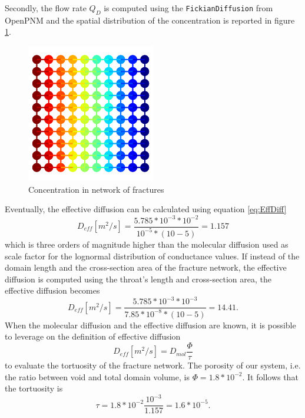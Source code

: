 \documentclass{article}
\begin{document}
Secondly, the flow rate $Q_D$ is computed using the \texttt{FickianDiffusion} from OpenPNM and the spatial distribution of the concentration is reported in figure \ref{fig:ConcInFractures}.
\FloatBarrier  %
\begin{figure}[htbp]
    \centering
    \includegraphics[width=0.5\textwidth]{images/fromOpenPNM/concentrationHeatMap.png}
    \caption{Concentration in network of fractures}
    \label{fig:ConcInFractures}
\end{figure}
Eventually, the effective diffusion can be calculated using equation \ref{eq:EffDiff}
\begin{equation}
    D_{eff} [m^2/s]=\frac{5.785*10^{-3}*10^{-2}}{10^{-5}*(10-5)}=1.157
    \label{eq:EffDiffDomain}
\end{equation}
which is three orders of magnitude higher than the molecular diffusion used as scale factor for the lognormal distribution of conductance values.
If instead of the domain length and the cross-section area of the fracture network, the effective diffusion is computed using the throat's length and cross-section area, the effective diffusion becomes
\begin{equation}
    D_{eff} [m^2/s]=\frac{5.785*10^{-3}*10^{-3}}{7.85*10^{-8}*(10-5)}=14.41.
    \label{eq:EffDiffFracture}
\end{equation}
When the molecular diffusion and the effective diffusion are known, it is possible to leverage on the definition of effective diffusion
\begin{equation}
    D_{eff} [m^2/s]=D_{mol}\frac{\Phi}{\tau}
    \label{eq:EffDiffDef}
\end{equation}
to evaluate the tortuosity of the fracture network. The porosity of our system, i.e. the ratio between void and total domain volume, is $\Phi=1.8*10^{-2}$. It follows that the tortuosity is
\begin{equation}
    \tau = 1.8*10^{-2}\frac{10^{-3}}{1.157} = 1.6*10^{-5}.
    \label{eq:Tortuosity}
\end{equation}
\end{document}
